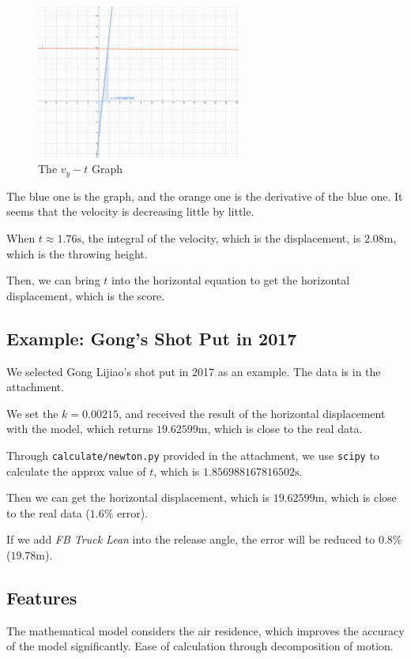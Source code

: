 \documentclass{article}
\begin{document}
\begin{figure}[H]
    \centering
    \includegraphics[width=0.6\textwidth]{figures/figure-1.pdf}
    \caption{The $v_y-t$ Graph}
    \label{fig:vy-t}
\end{figure}

The blue one is the graph, and the orange one is the derivative of the blue one. It seems that the velocity is decreasing little by little.

When $t \approx 1.76 \si{\second}$, the integral of the velocity, which is the displacement, is $2.08 \si{\meter}$, which is the throwing height.

Then, we can bring $t$ into the horizontal equation to get the horizontal displacement, which is the score.

\subsection{Example: Gong's Shot Put in 2017}

We selected Gong Lijiao's shot put in 2017 as an example. The data is in the attachment.

We set the $k = 0.00215$, and received the result of the horizontal displacement with the model, which returns $19.62599 \si{\meter}$, which is close to the real data.

Through \texttt{calculate/newton.py} provided in the attachment, we use \texttt{scipy} to calculate the approx value of $t$, which is $1.856988167816502 \si{\second}$.

Then we can get the horizontal displacement, which is $19.62599 \si{\meter}$, which is close to the real data ($1.6\%$ error).

If we add \textit{FB Truck Lean} into the release angle, the error will be reduced to $0.8\%$ ($19.78 \si{\meter}$).

\subsection{Features}

The mathematical model considers the air residence, which improves the accuracy of the model significantly. Ease of calculation through decomposition of motion.
\end{document}
